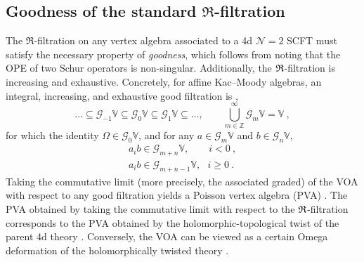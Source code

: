\subsection{Goodness of the standard $\mathfrak{R}$-filtration}
The $\mathfrak{R}$-filtration on any vertex algebra associated to a 4d $\mathcal{N} = 2$ SCFT must satisfy the necessary property of \emph{goodness}, which follows from noting that the OPE of two Schur operators is non-singular. Additionally, the $\mathfrak{R}$-filtration is increasing and exhaustive. Concretely, for affine Kac--Moody algebras, an integral, increasing, and exhaustive good filtration is \cite{LiVertexandVPA, ArabiArdehali:2025fad},
\begin{equation}
    \ldots \subseteq \mathcal{G}_{-1} \mathbb{V} \subseteq \mathcal{G}_{0} \mathbb{V} \subseteq \mathcal{G}_{1} \mathbb{V} \subseteq \ldots, \qquad \bigcup_{m \in \mathbb{Z}}^\infty \mathcal{G}_{m} \mathbb{V} = \mathbb{V}~,
\end{equation}
for which the identity $\Omega \in \mathcal{G}_0 \mathbb{V}$, and for any $a \in \mathcal{G}_{m}\mathbb{V}$ and $b \in \mathcal{G}_{n}\mathbb{V}$,
\begin{equation}
\begin{split}
    a_i b \in \mathcal{G}_{m+n} \mathbb{V}, \qquad i < 0~, \\
    a_i b \in \mathcal{G}_{m+n-1} \mathbb{V}, \ \ \  i \geqslant 0~.
\end{split}
\end{equation}
Taking the commutative limit (more precisely, the associated graded) of the VOA with respect to any good filtration yields a Poisson vertex algebra (PVA) \cite{LiVertexandVPA}. The PVA obtained by taking the commutative limit with respect to the $\mathfrak{R}$-filtration corresponds to the PVA obtained by the holomorphic-topological twist of the parent 4d theory \cite{Kapustin:2006hi}. Conversely, the VOA can be viewed as a certain Omega deformation of the holomorphically twisted theory \cite{Oh:2019bgz, Jeong:2019pzg}. 

